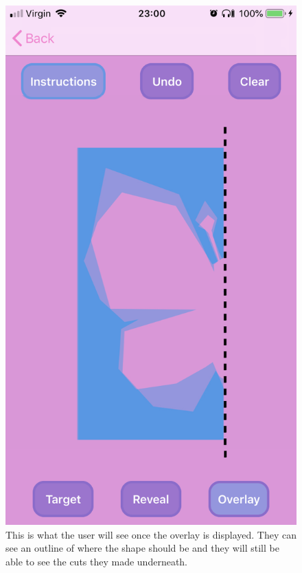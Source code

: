\documentclass[11pt]{article}
\begin{document}
                    \begin{figure}[!ht]
                        \begin{minipage}{0.45\textwidth}
                            \centering \includegraphics[width=0.7\linewidth]{KiriZen/matchCreateOverlay}
                            \caption{This is what the user will see once the overlay is displayed. They can see an outline of where the shape should be and they will still be able to see the cuts they made underneath.\\}
                            \label{fig:kiriZen-matchCreateOverlay}
                        \end{minipage}\hfill
                        \begin{minipage}{0.45\textwidth}
                            \centering

\end{minipage}
\end{figure}
\end{document}
